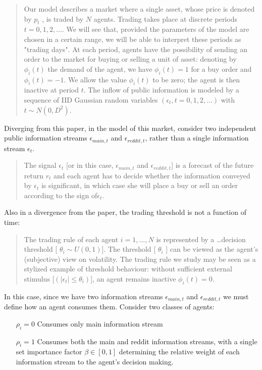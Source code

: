\documentclass[a4paper, 11pt]{report}
\begin{document}
\begin{quote}
	Our model describes a market where a single asset, whose price is denoted by $p_{t}$ , is traded by
	$N$ agents. Trading takes place at discrete periods $t = 0, 1, 2,\dots$. We will see that, provided
	the parameters of the model are chosen in a certain range, we will be able to interpret these
	periods as "trading days". At each period, agents have the possibility of sending an order to
	the market for buying or selling a unit of asset: denoting by $\phi_{i}(t)$ the demand of the agent,
	we have $\phi_{i}(t) = 1$ for a buy order and $\phi_{i}(t) = -1$. We allow the value $\phi_{i}(t)$ to be zero; the
	agent is then inactive at period $t$. The inflow of public information is modeled by a sequence
	of IID Gaussian random variables $(\epsilon_{t},t = 0, 1, 2,\dots)$ with $t \sim N(0, D^{2})$.
\end{quote}
Diverging from this paper, in the model of this market, consider two independent public information streams $\epsilon_{main,t}$ and $\epsilon_{reddit,t}$, rather than a single information stream $\epsilon_{t}$.
\begin{quote}
	The signal $\epsilon_{t}$ [or in this case, $\epsilon_{main,t}$ and $\epsilon_{reddit,t}$] is a forecast of
	the future return $r_{t}$ and each agent has to decide whether the information conveyed by $\epsilon_{t}$ is
	significant, in which case she will place a buy or sell an order according to the sign of$\epsilon_{t}$.
\end{quote}
Also in a divergence from the paper, the trading threshold is not a function of time:
\begin{quote}
	The trading rule of each agent $i = 1,..., N$ is represented by a \dots decision
	threshold [ $\theta_{i} \sim U(0,1)$]. The threshold [ $\theta_{i}$ ] can be viewed as the agent’s (subjective) view on volatility.
	The trading rule we study may be seen as a stylized example of threshold behaviour: without
	sufficient external stimulus [$(|\epsilon_{t}| \leq \theta_{i})$], an agent remains inactive $\phi_{i}(t) = 0$.
\end{quote}
In this case, since we have two information streams $\epsilon_{main,t}$ and $\epsilon_{reddit,t}$ we must define how an agent consumes them. Consider two classes of agents:
\begin{itemize}
	\item [$\rho_{i} = 0$] Consumes only main information stream
	\item [$\rho_{i} = 1$] Consumes both the main and reddit information streams, with a single set importance factor $\beta \in [0,1]$ determining the relative weight of each information stream to the agent's decision making. 
\end{itemize}
\end{document}
